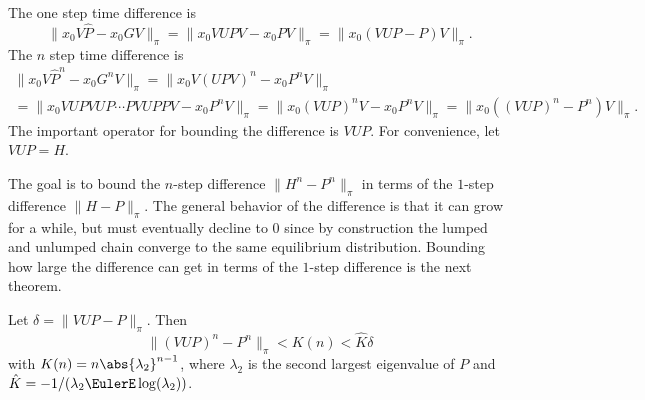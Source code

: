 \documentclass[12pt]{article}
\begin{document}
The one step time difference is
\[
    \| x_0 V \hat{P} - x_0 G V \|_{\pi} = \| x_0 V U P V - x_0 P V \|_{\pi}
    = \| x_0 (VUP - P) V \|_{\pi}.
\] The \( n \) step time difference is
\begin{multline*}
    \| x_0 V \hat{P}^n - x_0 G^n V \|_{\pi} = \| x_0 V (U P V)^n - x_0 P^n
    V \|_{\pi} \\
    = \| x_0 VUPVUP \cdots PVUPPV - x_0 P^n V \|_{\pi} = \| x_0 (VUP)^n
    V - x_0 P^n V \|_{\pi} = \| x_0 ((VUP)^n - P^n) V \|_{\pi}.
\end{multline*}
The important operator for bounding the difference is \( VUP \). For
convenience, let \( VUP = H \).

The goal is to bound the \( n \)-step difference \( \| H^n - P^n \|_{\pi}
\) in terms of the \( 1 \)-step difference \( \| H - P\|_{\pi} \).  The
general behavior of the difference is that it can grow for a while, but
must eventually decline to \( 0 \) since by construction the lumped and
unlumped chain converge to the same equilibrium distribution. Bounding
how large the difference can get in terms of the \( 1 \)-step difference
is the next theorem.

\begin{theorem}
    Let \( \delta = \| VUP - P \|_{\pi} \).  Then
    \[
        \| (VUP)^n - P^n \|_{\pi} < K(n) < \hat{K} \delta
    \] with \( K(n) = n \abs{\lambda_2}^{n-1} \), where \( \lambda_2 \)
    is the second largest eigenvalue of \( P \) and \( \hat{K} = -1/(\lambda_2
    \EulerE \log(\lambda_2)) \).
\end{theorem}
\end{document}
